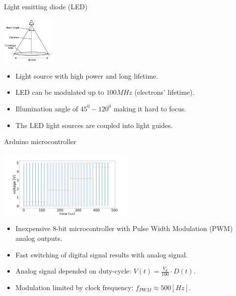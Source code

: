 \documentclass{beamer}
\begin{document}
\begin{frame}{Light emitting diode (LED)}
	\begin{center}		
		\includegraphics[width=0.2\textwidth,keepaspectratio]{FOV.jpg}
	\end{center}
	\begin{itemize}		
		\item Light source with high power and long lifetime.
		\item LED can be modulated up to $100MHz$ (electrons' lifetime).
		\item Illumination angle of $45^0-120^0$ making it hard to focus.
		\item The LED light sources are coupled into light guides.
	\end{itemize}
\end{frame}

\begin{frame}{Arduino microcontroller}
	\begin{center}		
		\includegraphics[width=0.5\textwidth,keepaspectratio]{duty_cycle.png}
	\end{center}
	\begin{itemize}		
		\item Inexpensive 8-bit microcontroller with Pulse Width Modulation (PWM) analog outputs.
		\item Fast switching of digital signal results with analog signal.
		\item Analog signal depended on duty-cycle: $V(t) =  \frac{V_d}{100}\cdot D(t)$.
		\item Modulation limited by clock frequency: $f_{PWM} \approx 500[Hz]$.
	\end{itemize}
\end{frame}
\end{document}
